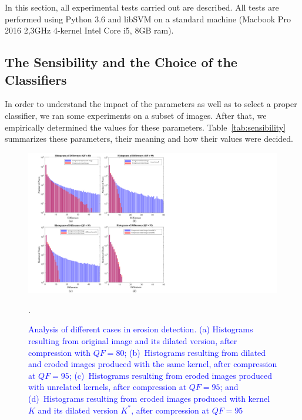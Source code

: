 \documentclass{ieeeaccess}
\newcommand{\revisedtext}[1]{\textcolor{blue}{#1}}
\begin{document}
In this section, all experimental tests carried out are described. 
All  tests are performed using Python 3.6 and libSVM on a standard machine (Macbook Pro 2016 2,3GHz 4-kernel Intel Core i5, 8GB ram).

\subsection{The Sensibility and the Choice of the Classifiers}
\label{subsec:sensibity}

In order to understand the impact of the parameters as well as to select a proper classifier, we ran some experiments on a subset of images. After that, we empirically determined the values for these parameters. Table~\ref{tab:sensibility} summarizes these parameters, their meaning and how their values were decided.
\begin{figure}[h!]
	\centering
	\includegraphics[width=0.8\linewidth]{morp_cases}
	\caption{\revisedtext{Analysis of different cases in erosion detection. (a) Histograms resulting from  original image and its dilated version, after compression with $QF= 80$; (b)~Histograms resulting from dilated and eroded images produced with the same kernel, after compression at $QF=95$;
		(c)~Histograms resulting from eroded images produced with unrelated kernels, after compression at $QF=95$; and
		(d)~Histograms resulting from eroded images produced with kernel $K$ and its dilated version $K^*$, after compression at $QF=95$}}.
	\label{fig:morp_cases}
\end{figure}
\end{document}
